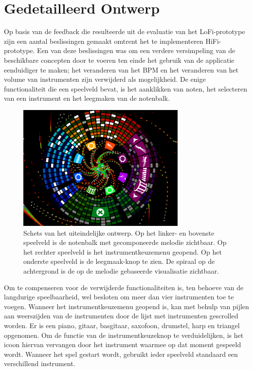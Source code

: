 \documentclass{acm}
\begin{document}
\section{Gedetailleerd Ontwerp}
\label{sec_detail}
Op basis van de feedback die resulteerde uit de evaluatie van het LoFi-prototype zijn een aantal beslissingen gemaakt omtrent het te implementeren HiFi-prototype. Een van deze beslissingen was om een verdere versimpeling van de beschikbare concepten door te voeren ten einde het gebruik van de applicatie eenduidiger te maken; het veranderen van het BPM en het veranderen van het volume van instrumenten zijn verwijderd als mogelijkheid. De enige functionaliteit die een speelveld bevat, is het aanklikken van noten, het selecteren van een instrument en het leegmaken van de notenbalk.

\begin{figure}
  \includegraphics[width=84mm]{img/muziektafel_v3}
  \caption{Schets van het uiteindelijke ontwerp. Op het linker- en bovenste speelveld is de notenbalk met gecomponeerde melodie zichtbaar. Op het rechter speelveld is het instrumentkeuzemenu geopend. Op het onderste speelveld is de leegmaak-knop te zien. De spiraal op de achtergrond is de op de melodie gebaseerde visualisatie zichtbaar.}
  \label{fig:muziektafel_v3}
\end{figure}

Om te compenseren voor de verwijderde functionaliteiten is, ten behoeve van de langdurige speelbaarheid, wel besloten om meer dan vier instrumenten toe te voegen. Wanneer het instrumentkeuzemenu geopend is, kan met behulp van pijlen aan weerszijden van de instrumenten door de lijst met instrumenten gescrolled worden. Er is een piano, gitaar, basgitaar, saxofoon, drumstel, harp en triangel opgenomen. Om de functie van de instrumentkeuzeknop te verduidelijken, is het icoon hiervan vervangen door het instrument waarmee op dat moment gespeeld wordt. Wanneer het spel gestart wordt, gebruikt ieder speelveld standaard een verschillend instrument.
\end{document}
